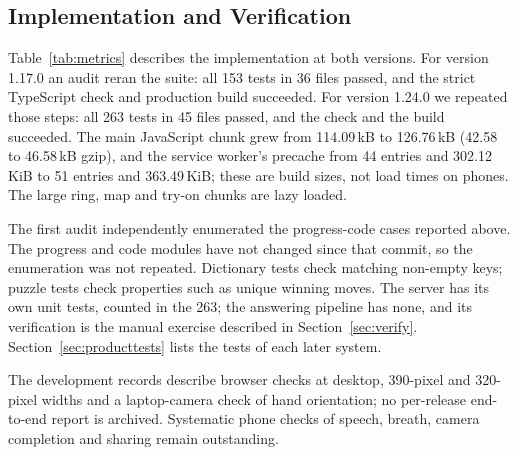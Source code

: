 \documentclass[sigconf,nonacm]{acmart}
\begin{document}
\subsection{Implementation and Verification}
Table~\ref{tab:metrics} describes the implementation at both versions. For version 1.17.0 an
audit reran the suite: all 153 tests in 36 files passed, and the strict TypeScript check and
production build succeeded. For version 1.24.0 we repeated those steps: all 263 tests in 45 files
passed, and the check and the build succeeded. The main JavaScript chunk grew from 114.09\,kB to
126.76\,kB (42.58 to 46.58\,kB gzip), and the service worker's precache from 44 entries and
302.12\,KiB to 51 entries and 363.49\,KiB; these are build sizes, not load times on phones. The
large ring, map and try-on chunks are lazy loaded.

The first audit independently enumerated the progress-code cases reported above. The progress
and code modules have not changed since that commit, so the enumeration was not repeated.
Dictionary tests check matching non-empty keys; puzzle tests check properties such as unique
winning moves. The server has its own unit tests, counted in the 263; the answering pipeline has
none, and its verification is the manual exercise described in Section~\ref{sec:verify}.
Section~\ref{sec:producttests} lists the tests of each later system.

The development records describe browser checks at desktop, 390-pixel and 320-pixel widths and a
laptop-camera check of hand orientation; no per-release end-to-end report is archived. Systematic
phone checks of speech, breath, camera completion and sharing remain outstanding.
\end{document}
